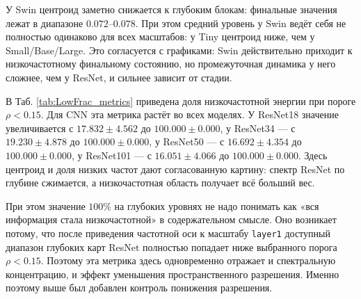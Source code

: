 У Swin центроид заметно снижается к глубоким блокам: финальные значения лежат в диапазоне $0.072$--$0.078$. При этом средний уровень у Swin ведёт себя не полностью одинаково для всех масштабов: у Tiny центроид ниже, чем у Small/Base/Large. Это согласуется с графиками: Swin действительно приходит к низкочастотному финальному состоянию, но промежуточная динамика у него сложнее, чем у ResNet, и сильнее зависит от стадии.

В Таб. \ref{tab:LowFrac_metrics} приведена доля низкочастотной энергии при пороге $\rho<0.15$. Для CNN эта метрика растёт во всех моделях. У ResNet18 значение увеличивается с $17.832\pm4.562$ до $100.000\pm0.000$, у ResNet34 — с $19.230\pm4.878$ до $100.000\pm0.000$, у ResNet50 — с $16.692\pm4.354$ до $100.000\pm0.000$, у ResNet101 — с $16.051\pm4.066$ до $100.000\pm0.000$. Здесь центроид и доля низких частот дают согласованную картину: спектр ResNet по глубине сжимается, а низкочастотная область получает всё больший вес.

При этом значение $100\%$ на глубоких уровнях не надо понимать как «вся информация стала низкочастотной» в содержательном смысле. Оно возникает потому, что после приведения частотной оси к масштабу \texttt{layer1} доступный диапазон глубоких карт ResNet полностью попадает ниже выбранного порога $\rho<0.15$. Поэтому эта метрика здесь одновременно отражает и спектральную концентрацию, и эффект уменьшения пространственного разрешения. Именно поэтому выше был добавлен контроль понижения разрешения.

